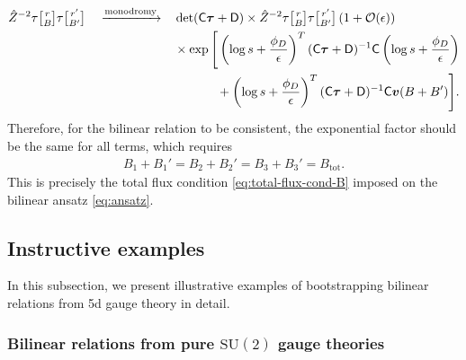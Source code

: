 \documentclass[11pt, a4paper]{article}
\newcommand{\tauftn}[2]{\tau\genfrac[]{0pt}{1}{#1}{#2}}
\theoremstyle{definition}
\begin{document}
\begin{align}
\hat Z^{-2}\tauftn{r}{B}\tauftn{r'}{B'}
\quad\xrightarrow{\mathrm{monodromy}}\quad
&
\det(\mathsf{C}\boldsymbol \tau+\mathsf{D})\times
\hat Z^{-2}\tauftn{r}{B}\tauftn{r'}{B'}
\left(1+\mathcal{O}(\epsilon)\right)
\nonumber\\
&\times
\exp\Bigg[
\left(\log s+\frac{\phi_D}{\epsilon}\right)^T
(\mathsf{C}\boldsymbol \tau+\mathsf{D})^{-1}\mathsf{C}
\left(\log s+\frac{\phi_D}{\epsilon}\right)
\nonumber\\
&\hspace{12mm}
+
\left(\log s+\frac{\phi_D}{\epsilon}\right)^T
(\mathsf{C}\boldsymbol \tau+\mathsf{D})^{-1}\mathsf{C}\boldsymbol v(B+B')
\Bigg].
\end{align}
Therefore, for the bilinear relation to be consistent, the exponential factor should be the same for all terms, which requires
\begin{align}
B_1+B_1'=B_2+B_2'=B_3+B_3'=B_{\mathrm{tot}}.
\end{align} 
This is precisely the total flux condition \eqref{eq:total-flux-cond-B} imposed on the bilinear ansatz \eqref{eq:ansatz}.




\subsection{Instructive examples} \label{sec:easy-example}

In this subsection, we present illustrative examples of bootstrapping bilinear relations from 5d gauge theory in detail.

\subsubsection{Bilinear relations from pure \texorpdfstring{$ \mathrm{SU}(2) $}{SU(2)} gauge theories} \label{sec:Nf0-bilinear}
\end{document}
